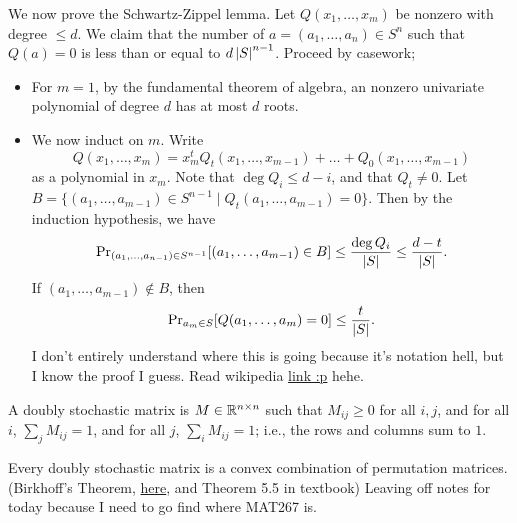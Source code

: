 We now prove the Schwartz-Zippel lemma. Let $Q(x_1, \dots, x_m)$ be nonzero with degree $\leq d$. We claim that the number of $a = (a_1, \dots, a_n) \in S^n$ such that $Q(a) = 0$ is less than or equal to $d \left\lvert S \right\rvert^{n-1}$. Proceed by casework;
\begin{itemize}
    \item For $m = 1$, by the fundamental theorem of algebra, an nonzero univariate polynomial of degree $d$ has at most $d$ roots.
    \item We now induct on $m$. Write
    \[ Q(x_1, \dots, x_m) = x^t_m Q_t(x_1, \dots, x_{m-1}) + \dots + Q_0(x_1, \dots, x_{m-1}) \]
    as a polynomial in $x_m$. Note that $\deg Q_i \leq d - i$, and that $Q_t \neq 0$. Let $B = \{ (a_1, \dots, a_{m-1}) \in S^{n-1} \mid Q_t(a_1, \dots, a_{m-1}) = 0 \}$. Then by the induction hypothesis, we have
    \[ \mathrm{Pr}_{(a_1, \dots, a_{n-1}) \in S^{n-1}} [(a_1, \dots, a_{m-1}) \in B] \leq \frac{\deg Q_i}{\left\lvert S \right\rvert} \leq \frac{d - t}{\left\lvert S \right\rvert}. \]
    If $(a_1, \dots, a_{m-1}) \not\in B$, then
    \[ \mathrm{Pr}_{a_m \in S} [Q(a_1, \dots, a_m) = 0] \leq \frac{t}{\left\lvert S \right\rvert}. \]
    I don't entirely understand where this is going because it's notation hell, but I know the proof I guess. Read wikipedia \href{https://en.wikipedia.org/wiki/Schwartz%E2%80%93Zippel_lemma}{link :p} hehe.
\end{itemize}
\begin{definition}
    A doubly stochastic matrix is $M \in \mathbb R^{n \times n}$ such that $M_{ij} \geq 0$ for all $i, j$, and for all $i$, $\sum_j M_{ij} = 1$, and for all $j$, $\sum_i M_{ij} = 1$; i.e., the rows and columns sum to $1$.
\end{definition}
\noindent Every doubly stochastic matrix is a convex combination of permutation matrices. (Birkhoff's Theorem, \href{https://webpages.charlotte.edu/ghetyei/courses/old/F13.3116/birkhofft.pdf}{here}, and Theorem 5.5 in textbook)
\medskip\newline
Leaving off notes for today because I need to go find where MAT267 is.